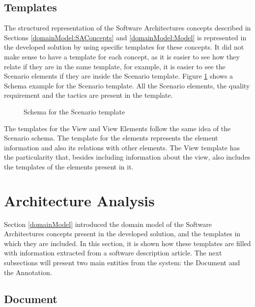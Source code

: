 \documentclass[conference]{IEEEtran}
\begin{document}
\subsection{Templates}
\label{domainModel:templates}
The structured representation of the Software Architectures concepts described in Sections \ref{domainModel:SAConcepts} and \ref{domainModel:Model} is represented in the developed solution by using specific templates for these concepts. It did not make sense to have a template for each concept, as it is easier to see how they relate if they are in the same template, for example, it is easier to see the Scenario elements if they are inside the Scenario template. Figure \ref{figure:scenarioTemplate} shows a Schema example for the Scenario template. All the Scenario elements, the quality requirement and the tactics are present in the template.

\begin{figure}
\centering

\caption{Schema for the Scenario template}
\label{figure:scenarioTemplate}
\end{figure}

The templates for the View and View Elements follow the same idea of the Scenario schema. The template for the elements represents the element information and also its relations with other elements. The View template has the particularity that, besides including information about the view, also includes the templates of the elements present in it.

\section{Architecture Analysis}
\label{architecture}
Section \ref{domainModel} introduced the domain model of the Software Architectures concepts present in the developed solution, and the templates in which they are included. In this section, it is shown how these templates are filled with information extracted from a software description article. The next subsections will present two main entities from the system: the Document and the Annotation.

\subsection{Document}
\label{architecture:Document}
\end{document}
